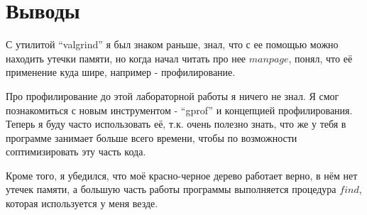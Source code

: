 \section{Выводы}

С утилитой \enquote{valgrind} я был знаком раньше, знал, что с ее помощью можно находить утечки памяти, но когда начал читать про нее $man page$, понял, что её применение куда шире, например - профилирование.

Про профилирование до этой лабораторной работы я ничего не знал. Я смог познакомиться с новым инструментом - \enquote{gprof} и концепцией профилирования. Теперь я буду часто использовать её, т.к. очень полезно знать, что же у тебя в программе занимает больше всего времени, чтобы по возможности соптимизировать эту часть кода.

Кроме того, я убедился, что моё красно-черное дерево работает верно, в нём нет утечек памяти, а большую часть работы программы выполняется процедура $find$, которая используется у меня везде.


\pagebreak
